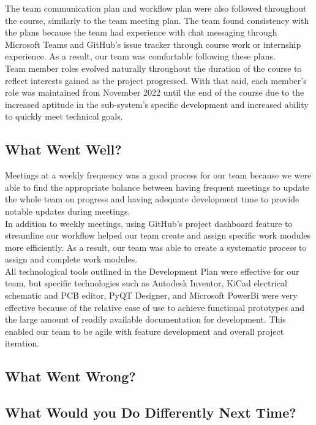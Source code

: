 \documentclass[12pt]{article}
\begin{document}
The team communication plan and workflow plan were also followed throughout the course, similarly to the team meeting plan. The team found consistency with the plans because the team had experience with chat messaging through Microsoft Teams and GitHub's issue tracker through course work or internship experience. As a result, our team was comfortable following these plans. \\

Team member roles evolved naturally throughout the duration of the course to reflect interests gained as the project progressed. With that said, each member's role was maintained from November 2022 until the end of the course due to the increased aptitude in the sub-system's specific development and increased ability to quickly meet technical goals. \\



\subsection{What Went Well?}


Meetings at a weekly frequency was a good process for our team because we were able to find the appropriate balance between having frequent meetings to update the whole team on progress and having adequate development time to provide notable updates during meetings. \\

In addition to weekly meetings, using GitHub's project dashboard feature to streamline our workflow helped our team create and assign specific work modules more efficiently. As a result, our team was able to create a systematic process to assign and complete work modules. \\

All technological tools outlined in the Development Plan were effective for our team, but specific technologies such as Autodesk Inventor, KiCad electrical schematic and PCB editor, PyQT Designer, and Microsoft PowerBi were very effective because of the relative ease of use to achieve functional prototypes and the large amount of readily available documentation for development. This enabled our team to be agile with feature development and overall project iteration. 

\subsection{What Went Wrong?}


\subsection{What Would you Do Differently Next Time?}

\end{document}
